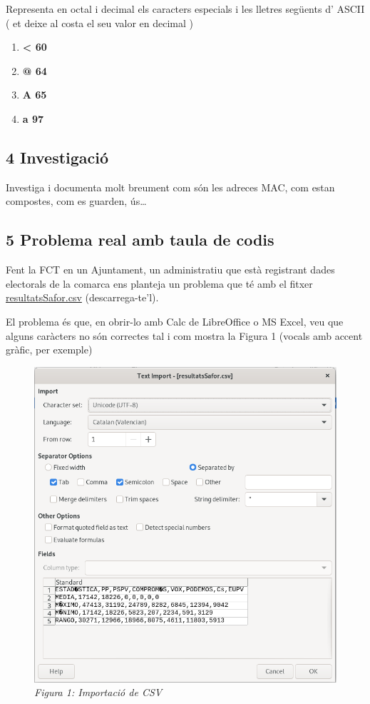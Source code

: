 \documentclass[
  12 pt,
  a4paper,
]{article}
\providecommand{\tightlist}{%
  \setlength{\itemsep}{0pt}\setlength{\parskip}{0pt}}
\begin{document}
Representa en octal i decimal els caracters especials i les lletres
següents d' ASCII ( et deixe al costa el seu valor en decimal )

\begin{enumerate}
\def\labelenumi{\arabic{enumi}.}
\tightlist
\item
  \textbf{\textless{} 60}
\item
  \textbf{@ 64}
\item
  \textbf{A 65}
\item
  \textbf{a 97}
\end{enumerate}

\subsection{4 Investigació}\label{investigaciuxf3}

Investiga i documenta molt breument com són les adreces MAC, com estan
compostes, com es guarden, ús\ldots{}

\subsection{5 Problema real amb taula de
codis}\label{problema-real-amb-taula-de-codis}

Fent la FCT en un Ajuntament, un administratiu que està registrant dades
electorals de la comarca ens planteja un problema que té amb el fitxer
\href{altres/resultatsSafor.csv}{resultatsSafor.csv} (descarrega-te'l).

El problema és que, en obrir-lo amb Calc de LibreOffice o MS Excel, veu
que alguns caràcters no són correctes tal i com mostra la Figura 1
(vocals amb accent gràfic, per exemple)

\begin{figure}
\centering
\includegraphics{png/resultatsSafor.png}
\caption{\emph{Figura 1: Importació de CSV}}
\end{figure}
\end{document}
